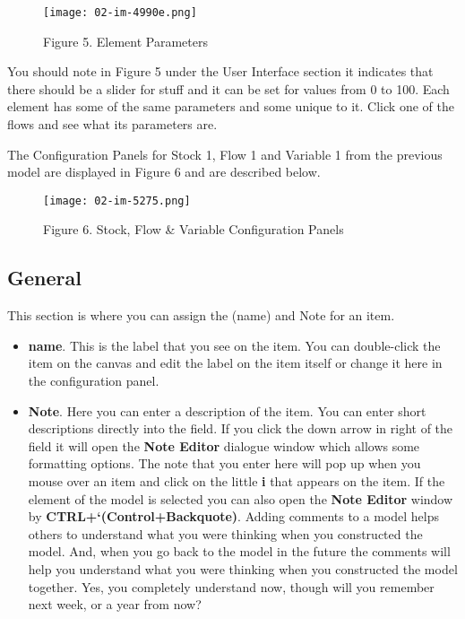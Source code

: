 \documentclass[]{memoir}
\let\Oldincludegraphics\includegraphics
\renewcommand{\includegraphics}[1]{\Oldincludegraphics[max size={\textwidth}{\textheight}]{#1}}
\renewcommand{\u}[1]{\textbf{#1}}
\renewcommand{\a}[1]{\textbf{#1}}
\begin{document}
\begin{figure}[htbp]
\centering
\texttt{[image: 02-im-4990e.png]}
\caption{Figure 5. Element Parameters}
\end{figure}

You should note in Figure 5 under the User Interface section it
indicates that there should be a slider for stuff and it can be set for
values from 0 to 100. Each element has some of the same parameters and
some unique to it. Click one of the flows and see what its parameters
are.

The Configuration Panels for Stock 1, Flow 1 and Variable 1 from the
previous model are displayed in Figure 6 and are described below.

\begin{figure}[htbp]
\centering
\texttt{[image: 02-im-5275.png]}
\caption{Figure 6. Stock, Flow \& Variable Configuration Panels}
\end{figure}

\subsection{General}

This section is where you can assign the (name) and Note for an item.

\begin{itemize}
\itemsep1pt\parskip0pt
\item
  \a{name}. This is the label that you see on the item. You can
  double-click the item on the canvas and edit the label on the item
  itself or change it here in the configuration panel.
\item
  \a{Note}. Here you can enter a description of the item. You can enter
  short descriptions directly into the field. If you click the down
  arrow in right of the field it will open the \u{Note Editor} dialogue
  window which allows some formatting options. The note that you enter
  here will pop up when you mouse over an item and click on the little
  \u{i} that appears on the item. If the element of the model is
  selected you can also open the \u{Note Editor} window by
  \u{CTRL+`(Control+Backquote)}. Adding comments to a model helps others
  to understand what you were thinking when you constructed the model.
  And, when you go back to the model in the future the comments will
  help you understand what you were thinking when you constructed the
  model together. Yes, you completely understand now, though will you
  remember next week, or a year from now?
\end{itemize}
\end{document}
